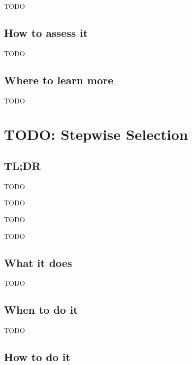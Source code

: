 \documentclass[
]{book}
\providecommand{\tightlist}{%
  \setlength{\itemsep}{0pt}\setlength{\parskip}{0pt}}
\begin{document}
TODO

\hypertarget{how-to-assess-it-11}{%
\section{How to assess it}\label{how-to-assess-it-11}}

TODO

\hypertarget{where-to-learn-more-11}{%
\section{Where to learn more}\label{where-to-learn-more-11}}

TODO

\hypertarget{stepwise-selection}{%
\chapter{TODO: Stepwise Selection}\label{stepwise-selection}}

\hypertarget{tldr-12}{%
\section{TL;DR}\label{tldr-12}}

\begin{description}
\tightlist
\item[What it does]
TODO
\item[When to do it]
TODO
\item[How to do it]
TODO
\item[How to assess it]
TODO
\end{description}

\hypertarget{what-it-does-12}{%
\section{What it does}\label{what-it-does-12}}

TODO

\hypertarget{when-to-do-it-12}{%
\section{When to do it}\label{when-to-do-it-12}}

TODO

\hypertarget{how-to-do-it-12}{%
\section{How to do it}\label{how-to-do-it-12}}
\end{document}
